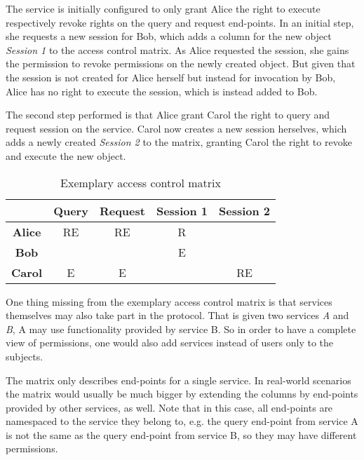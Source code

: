 The service is initially configured to only grant Alice the right to execute respectively revoke rights on the query and request end-points.
In an initial step, she requests a new session for Bob, which adds a column for the new object \emph{Session 1} to the access control matrix.
As Alice requested the session, she gains the permission to revoke permissions on the newly created object.
But given that the session is not created for Alice herself but instead for invocation by Bob, Alice has no right to execute the session, which is instead added to Bob.

The second step performed is that Alice grant Carol the right to query and request session on the service.
Carol now creates a new session herselves, which adds a newly created \emph{Session 2} to the matrix, granting Carol the right to revoke and execute the new object.

\begin{table}
    \centering
    \begin{tabular}{|c|c|c|c|c|}
        \hline
              & \bfseries Query & \bfseries Request & \bfseries Session 1 & \bfseries Session 2\\
        \hline
        \bfseries Alice & RE    & RE      & R         &\\
        \hline
        \bfseries Bob   &       &         & E         &\\
        \hline
        \bfseries Carol & E     & E       &           & RE\\
        \hline
    \end{tabular}

    \caption{Exemplary access control matrix}
    \label{tab:access-control-matrix}
\end{table}

One thing missing from the exemplary access control matrix is that services themselves may also take part in the protocol.
That is given two services \emph{A} and \emph{B}, A may use functionality provided by service B.
So in order to have a complete view of permissions, one would also add services instead of users only to the subjects.

The matrix only describes end-points for a single service.
In real-world scenarios the matrix would usually be much bigger by extending the columns by end-points provided by other services, as well.
Note that in this case, all end-points are namespaced to the service they belong to, e.g. the query end-point from service A is not the same as the query end-point from service B, so they may have different permissions.

